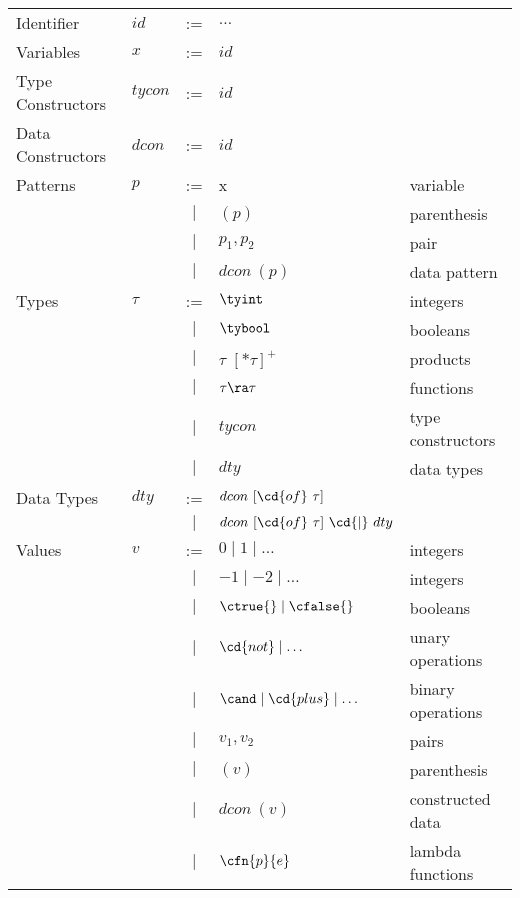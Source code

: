 \begin{definition}
\label{def:sparc::syntax}
\setlength{\tabcolsep}{20mm}
\begin{tabular}{llcll}
Identifier
& $id$ & := & $\ldots$
\\

%
Variables
& $x$ & := & $id$
\\

Type Constructors 
& $tycon$ & := & $id$
\\

Data Constructors 
& $dcon$ & := & $id$
\\

Patterns & $p$ 
& := & x & variable
\\
& & $\mid$  & $( p )$ & parenthesis
\\
& & $\mid$  & $p_1, p_2$ & pair
\\
& & $\mid$  & $dcon~( p )$ & data pattern
\\

Types & $\tau$ &  := & $\tyint$  & integers
\\
& &  $\mid$ &   $\tybool$  & booleans
\\
& &  $\mid$  & $\tau$ $[ * \tau ]^+$  & products
\\
& &  $\mid$  & $\tau \ra \tau$ & functions
\\
& & $\mid$ & $tycon$         &  type constructors
\\
& & $\mid$ & $dty$ & data types
\\

Data Types & $dty$
& := &   $dcon~[\cd{of}~\tau]$ 
\\
&  & $\mid$ &  $dcon~[ \cd{of}~\tau ]~\cd{|}~dty$
\\

Values & $v$
& := & $0  \mid  1  \mid  \ldots$ &  integers
\\
& & $\mid$ &  $-1  \mid -2  \mid \ldots$ &  integers
\\
& & $\mid$ & $\ctrue{} \mid  \cfalse{}$ & booleans
\\
& & $\mid$ & $\cd{not}  \mid \ldots$ & unary operations
\\
& & $\mid$ & $\cand  \mid  \cd{plus}  \mid  \ldots$ & binary operations
\\
& & $\mid$ & $v_1, v_2$  & pairs
\\
& & $\mid$ & $( v )$   & parenthesis
\\
& & $\mid$ & $dcon~( v )$  & constructed data
\\
& & $\mid$ & $\cfn{p}{e}$ & lambda functions
\\


\end{tabular}
\end{definition}

